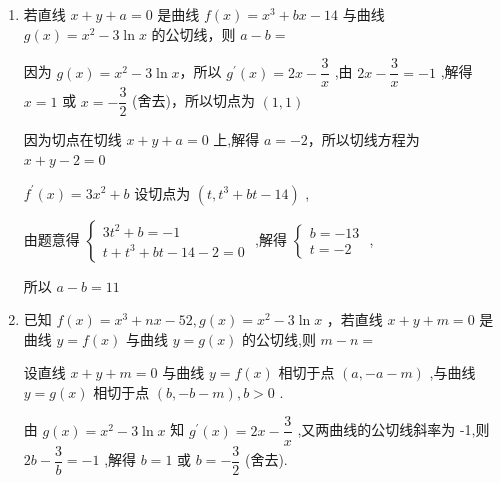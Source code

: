 \begin{enumerate}
\begin{enumerate}
\begin{jieda}
            则 $y = {x}^{2} - a\ln x$ 在点 $P\left( {1,1}\right)$ 处的切线的斜率为 ${\left. {y}^{\prime }\right| }_{x = 1} = 2 - a$ ,
            
            而 $y = {x}^{2} - a\ln x$ 在点 $P\left( {1,1}\right)$ 处的切线与直线 $y = x - 2$ 垂直，
            
            则 $2 - a =  - 1$ ，故 $a = 3$ .
        \end{jieda}
        
        \item 若直线 $x + y + a = 0$ 是曲线 $f\left( x\right)  = {x}^{3} + {bx} - {14}$ 与曲线 $g\left( x\right)  =  {x}^{2} - {3\ln }x$ 的公切线，则 $a - b =$
        \begin{jieda}
            因为 $g\left( x\right)  = {x}^{2} - 3\ln x$，所以 ${g}^{\prime }\left( x\right)  = {2x} - \dfrac{3}{x}$ ,由 ${2x} - \dfrac{3}{x} =  - 1$ ,解得 $x = 1$ 或 $x =  - \dfrac{3}{2}$ (舍去)，所以切点为 $\left( {1,1}\right)$
            
            因为切点在切线 $x + y + a = 0$ 上,解得 $a =  - 2$，所以切线方程为 $x + y - 2 = 0$
            
            ${f}^{\prime }\left( x\right)  = 3{x}^{2} + b$ 设切点为 $\left( {t,{t}^{3} + {bt} - {14}}\right)$ ,
            
            由题意得 $\left\{  \begin{matrix} 3{t}^{2} + b =  - 1 \\  t + {t}^{3} + {bt} - {14} - 2 = 0 \end{matrix}\right.$ ,解得 $\left\{  \begin{matrix} b =  - {13} \\  t =  - 2 \end{matrix}\right.$ ,
            
            所以 $a - b = {11}$
        \end{jieda}

        
        \item 已知 $f\left( x\right)  = {x}^{3} + {nx} - {52},g\left( x\right)  = {x}^{2} - 3\ln x$ ，若直线 $x + y + m = 0$ 是曲线 $y = f\left( x\right)$ 与曲线 $y = g\left( x\right)$ 的公切线,则 $m - n =$
        \begin{jieda}
            设直线 $x + y + m = 0$ 与曲线 $y = f\left( x\right)$ 相切于点 $\left( {a, - a - m}\right)$ ,与曲线 $y = g\left( x\right)$ 相切于点 $\left( {b, - b - m}\right) ,b > 0$ .
            
            由 $g\left( x\right)  = {x}^{2} - 3\ln x$ 知 ${g}^{\prime }\left( x\right)  = {2x} - \dfrac{3}{x}$ ,又两曲线的公切线斜率为 -1,则 ${2b} - \dfrac{3}{b} =  - 1$ ,解得 $b = 1$ 或 $b =  - \dfrac{3}{2}$ (舍去).
            

\end{jieda}
\end{enumerate}
\end{enumerate}
